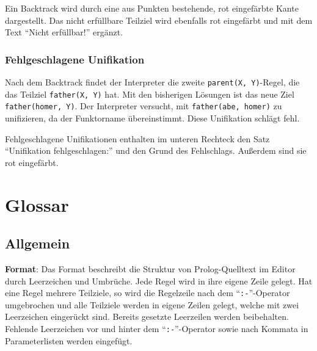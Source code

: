 \documentclass[parskip=full,11pt,twoside]{scrartcl}
\begin{document}
\begin{minipage}{\linewidth}
\end{minipage}

Ein Backtrack wird durch eine aus Punkten bestehende, rot eingefärbte Kante dargestellt.
Das nicht erfüllbare Teilziel wird ebenfalls rot eingefärbt und mit dem Text \enquote{Nicht erfüllbar!} ergänzt.

\subsubsection{Fehlgeschlagene Unifikation}

Nach dem Backtrack findet der Interpreter die zweite \texttt{parent(X, Y)}-Regel, die das Teilziel \texttt{father(X, Y)} hat.
Mit den bisherigen Lösungen ist das neue Ziel \texttt{father(homer, Y)}.
Der Interpreter versucht, mit \texttt{father(abe, homer)} zu unifizieren, da der Funktorname übereinstimmt.
Diese Unifikation schlägt fehl.

\begin{minipage}{\linewidth}
\end{minipage}

Fehlgeschlagene Unifikationen enthalten im unteren Rechteck den Satz \enquote{Unifikation fehlgeschlagen:} und den Grund des Fehlschlags.
Außerdem sind sie rot eingefärbt.

\section{Glossar}

\subsection{Allgemein}

\textbf{Format}:
Das Format beschreibt die Struktur von Prolog-Quelltext im Editor durch Leerzeichen und Umbrüche. Jede Regel wird in ihre eigene Zeile gelegt. Hat eine Regel mehrere Teilziele, so wird die Regelzeile nach dem \enquote{\texttt{:-}}-Operator umgebrochen und alle Teilziele werden in eigene Zeilen gelegt, welche mit zwei Leerzeichen eingerückt sind. Bereits gesetzte Leerzeilen werden beibehalten. Fehlende Leerzeichen vor und hinter dem \enquote{\texttt{:-}}-Operator sowie nach Kommata in Parameterlisten werden eingefügt.
\end{document}
